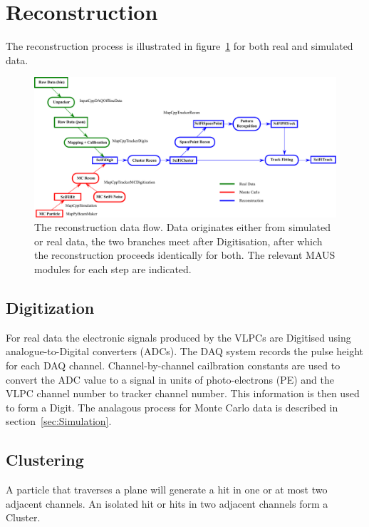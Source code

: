 \section{Reconstruction}
\label{sec:Reconstruction}
The reconstruction process is illustrated in figure~\ref{fig:DataFlow} for both real and simulated data.

\begin{figure}[tbh]
  \begin{center}
    \includegraphics[width=0.95\linewidth]{07-Reconstruction/DataFlow2014.pdf}
    \caption{\label{fig:DataFlow} The reconstruction data flow. Data originates either from simulated or real data, the two branches meet after Digitisation, after which the reconstruction proceeds identically for both.  The relevant MAUS modules for each step are indicated.}
  \end{center}
\end{figure}

  \subsection{Digitization}
  \label{subsec:Digitization}
  For real data the electronic signals produced by the VLPCs are Digitised using analogue-to-Digital converters (ADCs). The DAQ system records the pulse height for each DAQ channel.  Channel-by-channel cailbration constants are used to convert the ADC value to a signal in units of photo-electrons (PE) and the VLPC channel number to tracker channel number.  This information is then used to form a Digit.  The analagous process for Monte Carlo data is described in section~\ref{sec:Simulation}.

  \subsection{Clustering}
  \label{subsec:Clustering}
  A particle that traverses a plane will generate a hit in one or at most two adjacent channels.  An isolated hit or hits in two adjacent channels form a Cluster.  
  

